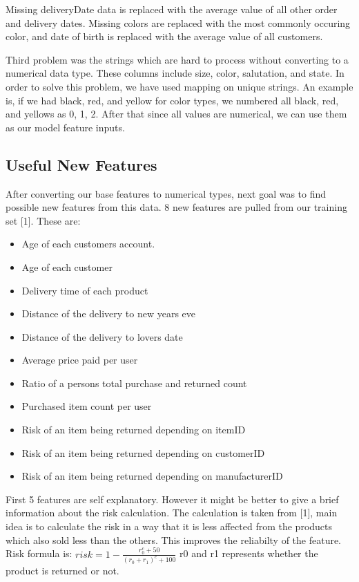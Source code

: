 \documentclass[a4paper, 10pt, conference]{ieeeconf}
\begin{document}
Missing deliveryDate data is replaced with the average value of all other order and delivery dates. Missing colors are replaced with the most commonly occuring color, and date of birth is replaced with the average value of all customers.

Third problem was the strings which are hard to process without converting to a numerical data type. These columns include size, color, salutation, and state. In order to solve this problem, we have used mapping on unique strings. An example is, if we had black, red, and yellow for color types, we numbered all black, red, and yellows as 0, 1, 2. After that since all values are numerical, we can use them as our model feature inputs.

\subsection{Useful New Features}

After converting our base features to numerical types, next goal was to find possible new features from this data. 8 new features are pulled from our training set [1]. These are: 
\begin{itemize}
	\item Age of each customers account.
	\item Age of each customer
	\item Delivery time of each product
	\item Distance of the delivery to new years eve
	\item Distance of the delivery to lovers date
	\item Average price paid per user
	\item Ratio of a persons total purchase and returned count
	\item Purchased item count per user
	\item Risk of an item being returned depending on itemID
	\item Risk of an item being returned depending on customerID
	\item Risk of an item being returned depending on manufacturerID
\end{itemize}

First 5 features are self explanatory. However it might be better to give a brief information about the risk calculation. The calculation is taken from [1], main idea is to calculate the risk in a way that it is less affected from the products which also sold less than the others. This improves the reliabilty of the feature. Risk formula is:
\bigbreak
$
risk = 1 - \frac{r_0^c + 50}{(r_0 + r_1)^c + 100}
$
\bigbreak
r0 and r1 represents whether the product is returned or not.
\end{document}
